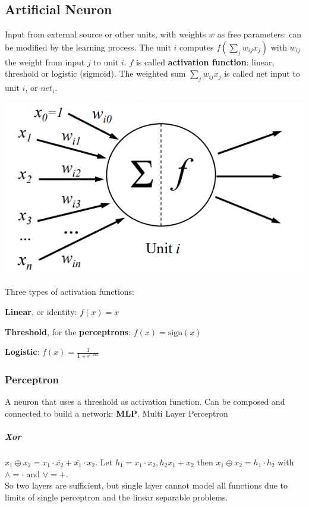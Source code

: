 \documentclass[10pt]{report}
\begin{document}
\subsection{Artificial Neuron} Input from external source or other units, with weights $w$ as free parameters: can be modified by the learning process. The unit $i$ computes $f(\sum_j w_{ij}x_j)$ with $w_{ij}$ the weight from input $j$ to unit $i$. $f$ is called \textbf{activation function}: linear, threshold or logistic (sigmoid). The weighted sum $\sum_j w_{ij}x_j$ is called net input to unit $i$, or $net_i$.
\begin{center}
	\includegraphics[scale=0.75]{6.png}
\end{center}
Three types of activation functions:
\begin{list}{}{}
	\item \textbf{Linear}, or identity: $f(x) = x$
	\item \textbf{Threshold}, for the \textbf{perceptrons}: $f(x) = \text{sign}(x)$
	\item \textbf{Logistic}: $f(x) = \frac{1}{1 + e^{-\alpha x}}$
\end{list}
\subsubsection{Perceptron} A neuron that uses a threshold as activation function. Can be composed and connected to build a network: \textbf{MLP}, Multi Layer Perceptron 
\subparagraph{Xor} $x_1 \oplus x_2 = x_1\cdot \overline{x_2} + \overline{x_1}\cdot x_2$. Let $h_1 = x_1\cdot x_2, h_2 x_1 + x_2$ then $x_1 \oplus x_2 = \overline{h_1} \cdot h_2$ with $\wedge = \cdot$ and $\vee = +$.\\
So two layers are sufficient, but single layer cannot model all functions due to limits of single perceptron and the linear separable problems.
\end{document}
